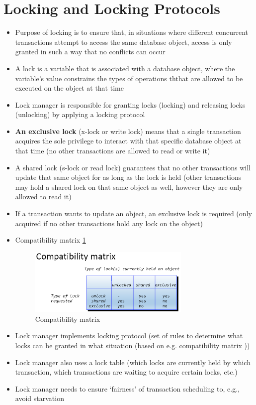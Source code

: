 \documentclass{report}
\begin{document}
    \section{Locking and Locking Protocols}
    \begin{itemize}
        \item Purpose of locking is to ensure that, in situations where different concurrent transactions attempt to access the  same database object, access is only granted in such a way that no conflicts can occur
        \item A lock is a variable that is associated with a database object, where the variable’s value constrains the types of operations ththat are allowed to be executed on the object at that time
        \item Lock manager is responsible for granting locks (locking) and releasing locks (unlocking) by applying a locking protocol
        \item \textbf{An exclusive lock} (x-lock or write lock) means that a single transaction acquires the sole privilege to interact with that specific database object at that time (no other transactions are allowed to read or write it)
        \item A {shared lock} (s-lock or read lock) guarantees that no other transactions will update that same object for as long as the lock is held (other transactions may hold a shared lock on that same object as well, however they are only allowed to read it)
        \item If a transaction wants to update an object, an exclusive lock is required (only acquired if no other transactions hold any lock on the object)
        \item Compatibility matrix \ref{fig:Compatibility-matrix}
        \begin{figure}
            \includegraphics[width=220pt]{./images/Compatibility-matrix.png}
            \caption{\label{fig:Compatibility-matrix}Compatibility matrix}
        \end{figure}
        \item Lock manager implements locking protocol (set of rules to determine what locks can be granted in what situation (based on e.g. compatibility matrix ))
        \item Lock manager also uses a lock table (which locks are currently held by which transaction, which transactions are waiting to acquire certain locks, etc.)
        \item Lock manager needs to ensure ‘fairness’ of transaction scheduling to, e.g., avoid starvation        
    \end{itemize}
\end{document}
